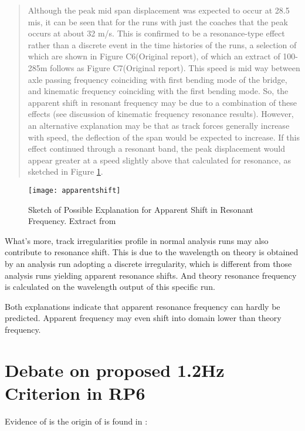 \begin{appendices}
\begin{quote}
Although the peak mid span displacement was expected to occur at 28.5 mis, it can be seen that for the runs with just the coaches that the peak occurs at about 32 m/s. This is confirmed to be a resonance-type effect rather than a discrete event in the time histories of the runs, a selection of which are shown in Figure C6(Original report), of which an extract of 100-285m follows as Figure C7(Original report). This speed is mid way between axle passing frequency coinciding with first bending mode of the bridge, and kinematic frequency coinciding with the first bending mode. So, the apparent shift in resonant frequency may be due to a combination of these effects (see discussion of kinematic frequency resonance results). However, an alternative explanation may be that as track forces generally increase with speed, the deflection of the span would be expected to increase. If this effect continued through a resonant band, the peak displacement would appear greater at a speed slightly above that calculated for resonance, as sketched in Figure \ref{fig:apparentshift}.
\end{quote}

\begin{figure}[h]
    \centering
    \texttt{[image: apparentshift]}
    \caption{Sketch of Possible Explanation for Apparent Shift in Resonant Frequency. Extract from \cite[Appendix 2]{d181dt329}}
    \label{fig:apparentshift}
\end{figure}

What's more, track irregularities profile in normal analysis runs may also contribute to resonance shift. This is due to the wavelength on theory is obtained by an analysis run adopting a discrete irregularity, which is different from those analysis runs yielding apparent resonance shifts. And theory resonance frequency is calculated on the wavelength output of this specific run. 

Both explanations indicate that apparent resonance frequency can hardly be predicted. Apparent frequency may even shift into domain lower than theory frequency. 


\section{Debate on proposed 1.2Hz Criterion in RP6}
Evidence of \cite{d181} is the origin of \cite[A.2.4.4.2.4(3)]{EC12} is found in \cite[p4.2: Lateral Frequencies]{d181}:


\end{appendices}
